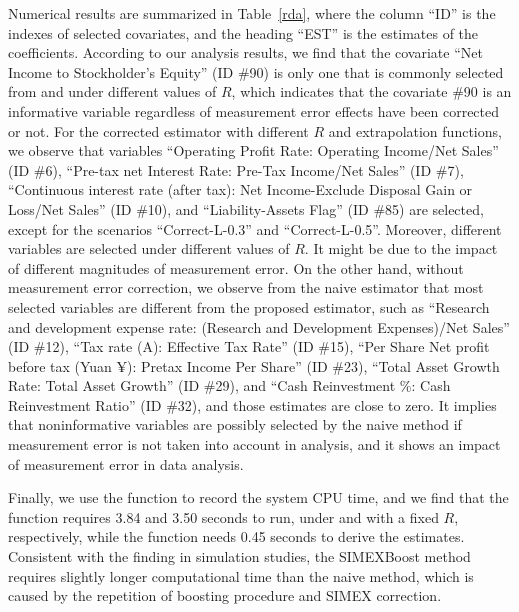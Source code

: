Numerical results are summarized in Table~\ref{rda}, where the column ``ID'' is the indexes of selected covariates, and the {heading} ``EST'' is the estimates of the coefficients. According to our analysis results, we find that the covariate ``Net Income to Stockholder's Equity'' (ID \#90) is only one that is commonly selected from   and  under different values of $R$, which indicates that the covariate \#90 is an informative variable regardless of measurement error effects have been corrected or not. For the corrected estimator with different $R$ and extrapolation functions, we observe that variables ``Operating Profit Rate: Operating Income/Net Sales'' (ID \#6),  ``Pre-tax net Interest Rate: Pre-Tax Income/Net Sales'' (ID \#7), ``Continuous interest rate (after tax): Net Income-Exclude Disposal Gain or Loss/Net Sales'' (ID \#10), and ``Liability-Assets Flag'' (ID \#85) are selected, except for the scenarios ``Correct-L-0.3'' and ``Correct-L-0.5''. Moreover, different variables are selected under different values of $R$. It might be due to the impact of different magnitudes of measurement error. On the other hand, without measurement error correction, we observe from the naive estimator that most selected variables are different from the proposed estimator, such as ``Research and development expense rate: (Research and Development Expenses)/Net Sales'' (ID \#12), ``Tax rate (A): Effective Tax Rate'' (ID \#15), ``Per Share Net profit before tax (Yuan ¥): Pretax Income Per Share'' (ID \#23), ``Total Asset Growth Rate: Total Asset Growth'' (ID \#29), and ``Cash Reinvestment \%: Cash Reinvestment Ratio'' (ID \#32), and those estimates are close to zero. It implies that noninformative variables are possibly selected by the naive method if measurement error is not taken into account in analysis, and it shows an impact of measurement error in data analysis. 

Finally, we use the function  to record the system CPU time, and we find that the function  requires 3.84 and 3.50 seconds to run, under  and  with a fixed $R$, respectively, while the function  needs 0.45 seconds to derive the {estimates}. Consistent with the finding in simulation studies, the SIMEXBoost method requires slightly longer computational time than the naive method, which is caused by the repetition of boosting procedure and SIMEX correction. %


